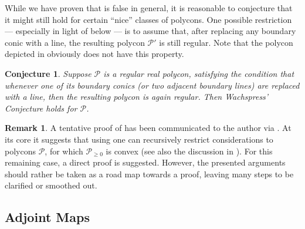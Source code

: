 \documentclass[a4paper,10pt]{amsart}
\theoremstyle{definition}
\newtheorem{rem}[defin]{Remark}
\theoremstyle{plain}
\newtheorem{conj}[defin]{Conjecture}
\newcommand{\cP}{{\mathcal P}}
\begin{document}
While we have proven that  is false in general, it is reasonable to conjecture that it might still hold for certain ``nice'' classes of polycons. One possible restriction --- especially in light of  below --- is to assume that, after replacing any boundary conic with a line, the resulting polycon $\cP'$ is still regular. Note that the polycon depicted in  obviously does not have this property.

\begin{conj} \label{conj: refinement}
 Suppose $\cP$ is a regular real polycon, satisfying the condition that whenever one of its boundary conics (or two adjacent boundary lines) are replaced with a line, then the resulting polycon is again regular. Then Wachspress' Conjecture holds for $\cP$.
\end{conj}

\begin{rem}
 A tentative proof of  has been communicated to the author via \cite{Wachspress2019ColdCase}. At its core it suggests that using \cite[Theorem 5.2]{Wachspress2016Adjoints} one can recursively restrict considerations to polycons $\cP$, for which $\cP_{\geq0}$ is convex (see also the discussion in \cite[\S11.4]{Wachspress2016Adjoints}). For this remaining case, a direct proof is suggested. However, the presented arguments should rather be taken as a road map towards a proof, leaving many steps to be clarified or smoothed out.
\end{rem}



\subsection{Adjoint Maps}
\end{document}
